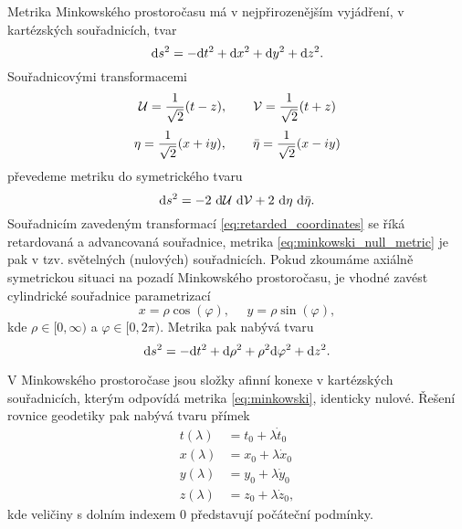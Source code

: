 Metrika Minkowského prostoročasu má v nejpřirozenějším vyjádření, v kartézských souřadnicích, tvar
\begin{equation}
     \label{eq:minkowski}
     \mathrm{d} s^2 = - \mathrm{d} t^2 + \mathrm{d} x^2 + \mathrm{d} y^2 + \mathrm{d} z^2.
\end{equation}
Souřadnicovými transformacemi
\begin{equation}
     \label{eq:retarded_coordinates}
     \mathcal{U} = \frac{1}{\sqrt{2}} (t - z),~~~~~~\mathcal{V} = \frac{1}{\sqrt{2}} (t + z)
\end{equation}
\begin{equation}
     \eta = \frac{1}{\sqrt{2}} (x + iy), ~~~~~~\bar{\eta} = \frac{1}{\sqrt{2}} (x - iy)
\end{equation}
převedeme metriku do symetrického tvaru
\begin{equation}
     \label{eq:minkowski_null_metric}
     \mathrm{d} s^2 = -2 ~ \mathrm{d} \mathcal{U} ~ \mathrm{d} \mathcal{V} + 2 ~ \mathrm{d} \eta ~ \mathrm{d} \bar{\eta}.
\end{equation}
Souřadnicím zavedeným transformací \eqref{eq:retarded_coordinates} se říká retardovaná a advancovaná souřadnice,
metrika \eqref{eq:minkowski_null_metric} je pak v tzv. světelných (nulových) souřadnicích.
Pokud zkoumáme axiálně symetrickou situaci na pozadí Minkowského prostoročasu, je vhodné zavést cylindrické
souřadnice parametrizací
\begin{equation}
     x = \rho \cos (\varphi), ~~~~~~ y = \rho \sin (\varphi),
\end{equation}
kde $\rho \in [0, \infty)$ a $\varphi \in [0, 2\pi)$. Metrika pak nabývá tvaru
\begin{equation}
     \mathrm{d} s^2 = -\mathrm{d} t^2 + \mathrm{d} \rho^2 + \rho^2 \mathrm{d} \varphi^2 + \mathrm{d} z^2.
\end{equation}

V Minkowského prostoročase jsou složky afinní konexe v kartézských souřadnicích,
kterým odpovídá metrika \ref{eq:minkowski}, identicky nulové. Řešení rovnice geodetiky pak
nabývá tvaru přímek
\begin{equation}
     \label{eq:minkowski_cartesian_geodesics}
     \begin{split}
     t(\lambda) &= t_0 + \lambda {\dot t}_0 \\
     x(\lambda) &= x_0 + \lambda {\dot x}_0 \\
     y(\lambda) &= y_0 + \lambda {\dot y}_0 \\
     z(\lambda) &= z_0 + \lambda {\dot z}_0,
     \end{split}
\end{equation}
kde veličiny s dolním indexem $0$ představují počáteční podmínky.


